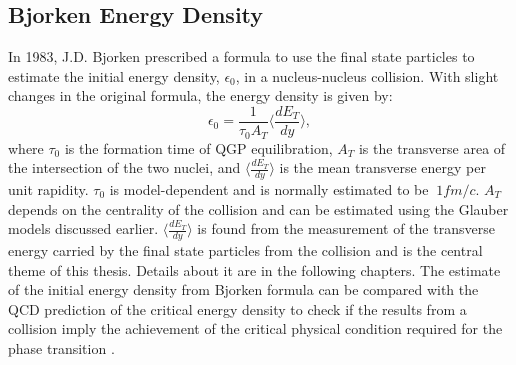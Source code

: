 \subsection{Bjorken Energy Density}
In 1983, J.D. Bjorken\cite{PhysRevD.27.140} prescribed a formula to use the final state particles to estimate the initial energy density, $\epsilon_{0}$, in a nucleus-nucleus collision. With slight changes in the original formula, the energy density is given by:
	\begin{equation}\label{eqn:bjorken}
	\epsilon_{0} = \frac{1}{\tau_{0}A_{T}}\langle\frac{dE_{T}}{dy}\rangle,
	\end{equation}
where $\tau_{0}$ is the formation time of QGP equilibration, $A_{T}$ is the transverse area of the intersection of the two nuclei, and $\langle\frac{dE_{T}}{dy}\rangle$ is the mean transverse energy per unit rapidity. $\tau_{0}$ is model-dependent and is normally estimated to be $~1 fm/c$. $A_{T}$ depends on the centrality of the collision and can be estimated using the Glauber models discussed earlier. $\langle\frac{dE_{T}}{dy}\rangle$ is found from the measurement of the transverse energy carried by the final state particles from the collision and is the central theme of this thesis. Details about it are in the following chapters.
The estimate of the initial energy density from Bjorken formula can be compared with the QCD prediction of the critical energy density\cite{Adam:2139456} to check if the results from a collision imply the achievement of the critical physical condition required for the phase transition \cite{2005PrPNP..54..443J}.

